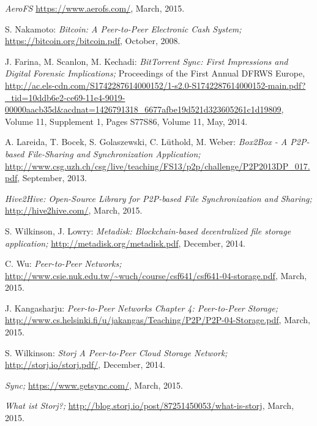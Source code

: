 \begin{thebibliography}{99}
		\emph{AeroFS}
		\url{https://www.aerofs.com/},
		March, 2015.

		S. Nakamoto:
		\emph{Bitcoin: A Peer-to-Peer Electronic Cash System;}
		\url{https://bitcoin.org/bitcoin.pdf},
		October, 2008.

		J. Farina, M. Scanlon, M. Kechadi:
		\emph{BitTorrent Sync: First Impressions and Digital Forensic Implications;}
		Proceedings of the First Annual DFRWS Europe,
		\url{http://ac.els-cdn.com/S1742287614000152/1-s2.0-S1742287614000152-main.pdf?_tid=10ddb6e2-ce69-11e4-9019-00000aacb35d&acdnat=1426791318_6677afbe19d521d323605261c1d19809},
		Volume 11, Supplement 1, Pages S77\textendash S86, Volume 11, May, 2014.

		A. Lareida, T. Bocek, S. Golaszewski, C. L\"uthold, M. Weber:
		\emph{Box2Box - A P2P-based File-Sharing and Synchronization Application;}
		\url{http://www.csg.uzh.ch/csg/live/teaching/FS13/p2p/challenge/P2P2013DP_017.pdf},
		September, 2013.

		\emph{Hive2Hive: Open-Source Library for P2P-based File Synchronization and Sharing;}
		\url{http://hive2hive.com/},
		March, 2015.

		S. Wilkinson, J. Lowry:
		\emph{Metadisk: Blockchain-based decentralized file storage application;}
		\url{http://metadisk.org/metadisk.pdf},
		December, 2014.

		C. Wu:
		\emph{Peer-to-Peer Networks;}
		\url{http://www.csie.nuk.edu.tw/~wuch/course/csf641/csf641-04-storage.pdf},
		March, 2015.

		J. Kangasharju:
		\emph{Peer-to-Peer Networks Chapter 4: Peer-to-Peer Storage;}
		\url{http://www.cs.helsinki.fi/u/jakangas/Teaching/P2P/P2P-04-Storage.pdf},
		March, 2015.

		S. Wilkinson:
		\emph{Storj A Peer-to-Peer Cloud Storage Network;}
		\url{http://storj.io/storj.pdf/},
		December, 2014.

		\emph{Sync;}
		\url{https://www.getsync.com/},
		March, 2015.
		
		\emph{What ist Storj?;}
		\url{http://blog.storj.io/post/87251450053/what-is-storj},
		March, 2015.
\end{thebibliography}